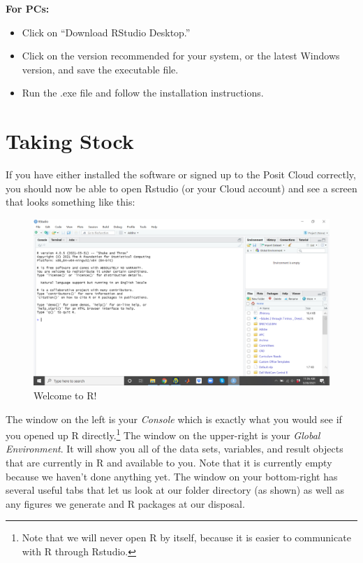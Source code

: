 \documentclass[
]{book}
\begin{document}
\textbf{For PCs:}

\begin{itemize}
\item
  Click on ``Download RStudio Desktop.''
\item
  Click on the version recommended for your system, or the latest Windows version, and save the executable file.
\item
  Run the .exe file and follow the installation instructions.
\end{itemize}

\section{Taking Stock}\label{taking-stock}

If you have either installed the software or signed up to the Posit Cloud correctly, you should now be able to open Rstudio (or your Cloud account) and see a screen that looks something like this:

\begin{figure}

{\centering \includegraphics[width=0.75\linewidth]{images/Screenshot1} 

}

\caption{Welcome to R!}\label{fig:unnamed-chunk-29}
\end{figure}

The window on the left is your \emph{Console} which is exactly what you would see if you opened up R directly.\footnote{Note that we will never open R by itself, because it is easier to communicate with R through Rstudio.} The window on the upper-right is your \emph{Global Environment}. It will show you all of the data sets, variables, and result objects that are currently in R and available to you. Note that it is currently empty because we haven't done anything yet. The window on your bottom-right has several useful tabs that let us look at our folder directory (as shown) as well as any figures we generate and R packages at our disposal.
\end{document}
